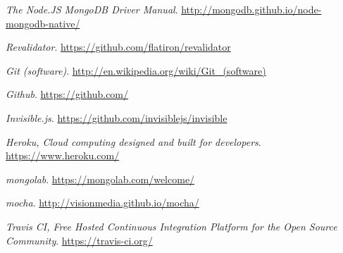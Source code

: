 \documentclass[doc,helv,longtable]{article}
\begin{document}
\begin{thebibliography}{150}
  \emph{The Node.JS MongoDB Driver Manual}.
  \url{http://mongodb.github.io/node-mongodb-native/}

  \emph{Revalidator}.
  \url{https://github.com/flatiron/revalidator}

  \emph{Git (software)}.
  \url{http://en.wikipedia.org/wiki/Git_(software)}

  \emph{Github}.
  \url{https://github.com/}

  \emph{Invisible.js}.
  \url{https://github.com/invisiblejs/invisible}

  \emph{Heroku, Cloud computing designed and built for developers}.
  \url{https://www.heroku.com/}

  \emph{mongolab}.
  \url{https://mongolab.com/welcome/}

  \emph{mocha}.
  \url{http://visionmedia.github.io/mocha/}

  \emph{Travis CI, Free Hosted Continuous Integration Platform for the Open Source Community}.
  \url{https://travis-ci.org/}

\end{thebibliography}
\end{document}
